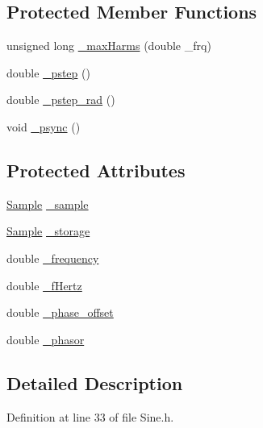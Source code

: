 \subsection*{Protected Member Functions}
\begin{DoxyCompactItemize}
\item 
unsigned long \hyperlink{classSignal_1_1Fourier_1_1FourierGenerator_a99720416bd9ff96636f4acf956a785d5}{\+\_\+max\+Harms} (double \+\_\+frq)
\item 
double \hyperlink{classSignal_1_1SignalGenerator_a43b0eec84ee7df04c947533c0511c2c0}{\+\_\+pstep} ()
\item 
double \hyperlink{classSignal_1_1SignalGenerator_abf2f4ab977c6e84bf85022eab8135304}{\+\_\+pstep\+\_\+rad} ()
\item 
void \hyperlink{classSignal_1_1SignalGenerator_a563f57d4dfd8728a6a572f15c1e2532b}{\+\_\+psync} ()
\end{DoxyCompactItemize}
\subsection*{Protected Attributes}
\begin{DoxyCompactItemize}
\item 
\hyperlink{classSignal_1_1Sample}{Sample} \hyperlink{classSignal_1_1Fourier_1_1FourierGenerator_ad720bf2b268dc621ace64c54c0816597}{\+\_\+sample}
\item 
\hyperlink{classSignal_1_1Sample}{Sample} \hyperlink{classSignal_1_1Fourier_1_1FourierGenerator_ab6e6b79cf56e31c9a1b5766f357f8cfb}{\+\_\+storage}
\item 
double \hyperlink{classSignal_1_1SignalGenerator_a7f107461333bce68c5dad412db96a8c2}{\+\_\+frequency}
\item 
double \hyperlink{classSignal_1_1SignalGenerator_a85a4702347352bab1c71e0a8df8437d6}{\+\_\+f\+Hertz}
\item 
double \hyperlink{classSignal_1_1SignalGenerator_a6b4444d46747c8517171edbbf4b5588f}{\+\_\+phase\+\_\+offset}
\item 
double \hyperlink{classSignal_1_1SignalGenerator_af4aa0728ded00777be26a06d883eaeb3}{\+\_\+phasor}
\end{DoxyCompactItemize}


\subsection{Detailed Description}


Definition at line 33 of file Sine.\+h.



